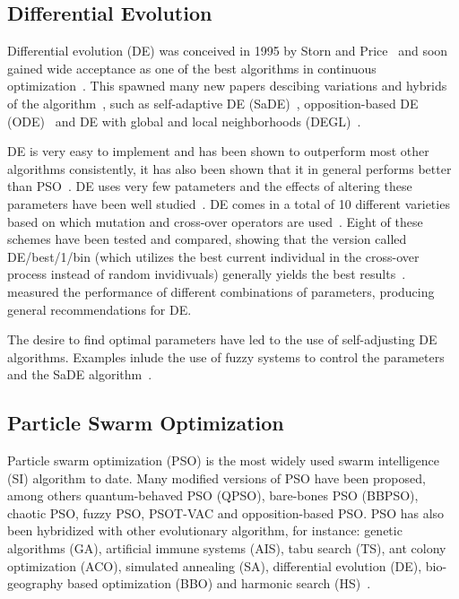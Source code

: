 \subsection{Differential Evolution}

Differential evolution (DE) was conceived in 1995 by Storn and Price~\cite{storn1995differential} and soon gained wide acceptance as one of the best algorithms in continuous optimization~\cite{price1997differential}. This spawned many new papers descibing variations and hybrids of the algorithm~\cite{5601760}, such as self-adaptive DE (SaDE)~\cite{qin2009differential}, opposition-based DE (ODE)~\cite{rahnamayan2008opposition} and DE with global and local neighborhoods (DEGL)~\cite{rahnamayan2008opposition}.

DE is very easy to implement and has been shown to outperform most other algorithms consistently, it has also been shown that it in general performs better than PSO~\cite{das2009differential, vesterstrom2004comparative}. DE uses very few patameters and the effects of altering these parameters have been well studied~\cite{5601760}. DE comes in a total of 10 different varieties based on which mutation and cross-over operators are used~\cite{price2006differential}. Eight of these schemes have been tested and compared, showing that the version called DE/best/1/bin (which utilizes the best current individual in the cross-over process instead of random invidivuals) generally yields the best results~\cite{mezura2006comparative}.~\cite{gamperle2002parameter} measured the performance of different combinations of parameters, producing general recommendations for DE.

The desire to find optimal parameters have led to the use of self-adjusting DE algorithms. Examples inlude the use of fuzzy systems to control the parameters~\cite{liu2005fuzzy} and the SaDE algorithm~\cite{qin2009differential}.

\subsection{Particle Swarm Optimization}

Particle swarm optimization (PSO) is the most widely used swarm intelligence (SI) algorithm to date. Many modified versions of PSO have been proposed, among others quantum-behaved PSO (QPSO), bare-bones PSO (BBPSO), chaotic PSO, fuzzy PSO, PSOT-VAC and opposition-based PSO. PSO has also been hybridized with other evolutionary algorithm, for instance: genetic algorithms (GA), artificial immune systems (AIS), tabu search (TS), ant colony optimization (ACO), simulated annealing (SA), differential evolution (DE), bio-geography based optimization (BBO) and harmonic search (HS)~\cite{zhang2015comprehensive}.

